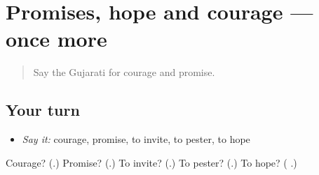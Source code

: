 \section[(dialogue)]{Promises, hope and courage — once more}

\label{lesson:GU-R272-review-final-272}



\begin{quote}
Say the Gujarati for courage and promise.
\end{quote}

\subsection*{Your turn}
\begin{itemize}
\raggedright
  \item \emph{Say it:} courage, promise, to invite, to pester, to hope
\end{itemize}

\begin{tcolorbox}[breakable,colback=teal!4,colframe=teal!35!black,title={Before you move on}]
Courage? (\textbf{}.) Promise? (\textbf{}.) To invite? (\textbf{}.) To pester? (\textbf{}.) To hope? (\textbf{ }.)
\end{tcolorbox}
